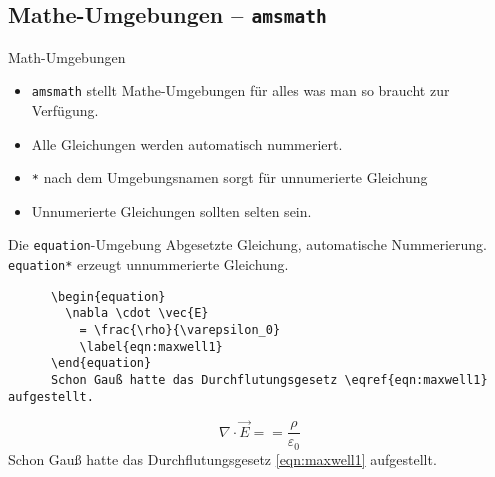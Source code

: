 \subsection{Mathe-Umgebungen – \texttt{amsmath}}

\begin{frame}{Math-Umgebungen}
  \begin{itemize}
    \item \texttt{amsmath} stellt Mathe-Umgebungen für alles was man so braucht zur Verfügung.
      \item Alle Gleichungen werden automatisch nummeriert.
      \item \texttt{*} nach dem Umgebungsnamen sorgt für unnumerierte Gleichung
      \item Unnumerierte Gleichungen sollten selten sein.
  \end{itemize}
\end{frame}

\begin{frame}[fragile]{Die \texttt{equation}-Umgebung}
  Abgesetzte Gleichung, automatische Nummerierung. \\
  \texttt{equation*} erzeugt unnummerierte Gleichung.
  \begin{CodeExample}{0.60}
    \begin{lstlisting}
      \begin{equation}
        \nabla \cdot \vec{E}
          = \frac{\rho}{\varepsilon_0}
          \label{eqn:maxwell1}
      \end{equation}
      Schon Gauß hatte das Durchflutungsgesetz \eqref{eqn:maxwell1} aufgestellt.
    \end{lstlisting}
  \CodeResult
    \begin{equation}
      \nabla \cdot \vec{E} =
        = \frac{\rho}{\varepsilon_0}
        \label{eqn:maxwell1}
    \end{equation}
    Schon Gauß hatte das Durchflutungsgesetz \eqref{eqn:maxwell1} aufgestellt.
  \end{CodeExample}
\end{frame}

